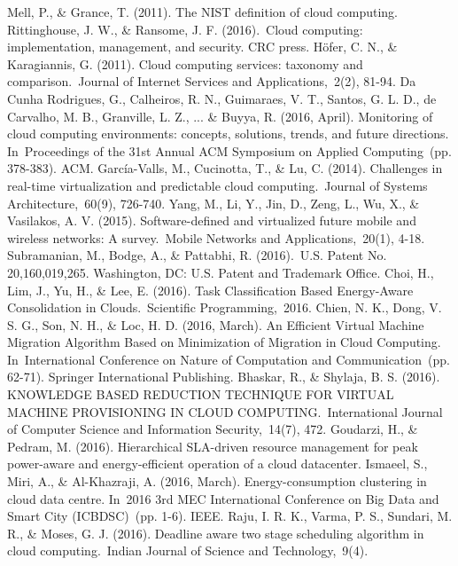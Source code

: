 \begin{thebibliography}{99}
\begin{LTRitems}
	Mell, P., \& Grance, T. (2011). The NIST definition of cloud computing.
	Rittinghouse, J. W., \& Ransome, J. F. (2016). Cloud computing: implementation, management, and security. CRC press.
	Höfer, C. N., \& Karagiannis, G. (2011). Cloud computing services: taxonomy and comparison. Journal of Internet Services and Applications, 2(2), 81-94.
	Da Cunha Rodrigues, G., Calheiros, R. N., Guimaraes, V. T., Santos, G. L. D., de Carvalho, M. B., Granville, L. Z., ... \& Buyya, R. (2016, April). Monitoring of cloud computing environments: concepts, solutions, trends, and future directions. In Proceedings of the 31st Annual ACM Symposium on Applied Computing (pp. 378-383). ACM.
	García-Valls, M., Cucinotta, T., \& Lu, C. (2014). Challenges in real-time virtualization and predictable cloud computing. Journal of Systems Architecture, 60(9), 726-740.
	Yang, M., Li, Y., Jin, D., Zeng, L., Wu, X., \& Vasilakos, A. V. (2015). Software-defined and virtualized future mobile and wireless networks: A survey. Mobile Networks and Applications, 20(1), 4-18.
	 Subramanian, M., Bodge, A., \& Pattabhi, R. (2016). U.S. Patent No. 20,160,019,265. Washington, DC: U.S. Patent and Trademark Office.
	 Choi, H., Lim, J., Yu, H., \& Lee, E. (2016). Task Classification Based Energy-Aware Consolidation in Clouds. Scientific Programming, 2016.
	 Chien, N. K., Dong, V. S. G., Son, N. H., \& Loc, H. D. (2016, March). An Efficient Virtual Machine Migration Algorithm Based on Minimization of Migration in Cloud Computing. In International Conference on Nature of Computation and Communication (pp. 62-71). Springer International Publishing.
	 Bhaskar, R., \& Shylaja, B. S. (2016). KNOWLEDGE BASED REDUCTION TECHNIQUE FOR VIRTUAL MACHINE PROVISIONING IN CLOUD COMPUTING. International Journal of Computer Science and Information Security, 14(7), 472.
	 Goudarzi, H., \& Pedram, M. (2016). Hierarchical SLA-driven resource management for peak power-aware and energy-efficient operation of a cloud datacenter.
	  Ismaeel, S., Miri, A., \& Al-Khazraji, A. (2016, March). Energy-consumption clustering in cloud data centre. In 2016 3rd MEC International Conference on Big Data and Smart City (ICBDSC) (pp. 1-6). IEEE.
	  Raju, I. R. K., Varma, P. S., Sundari, M. R., \& Moses, G. J. (2016). Deadline aware two stage scheduling algorithm in cloud computing. Indian Journal of Science and Technology, 9(4).

\end{LTRitems}
\end{thebibliography}
